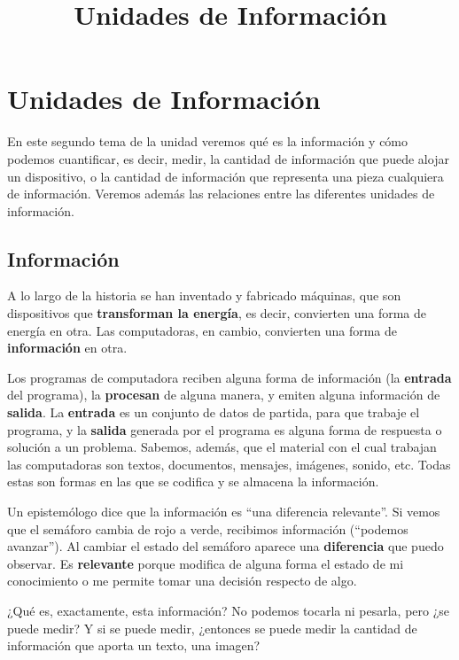 \documentclass[spanish,A4,]{article}
\title{Unidades de Información}
\begin{document}
\maketitle

\section{Unidades de Información}\label{unidades-de-informaciuxf3n}

En este segundo tema de la unidad veremos qué es la información y cómo
podemos cuantificar, es decir, medir, la cantidad de información que
puede alojar un dispositivo, o la cantidad de información que representa
una pieza cualquiera de información. Veremos además las relaciones entre
las diferentes unidades de información.

\subsection{Información}\label{informaciuxf3n}

A lo largo de la historia se han inventado y fabricado máquinas, que son
dispositivos que \textbf{transforman la energía}, es decir, convierten
una forma de energía en otra. Las computadoras, en cambio, convierten
una forma de \textbf{información} en otra.

Los programas de computadora reciben alguna forma de información (la
\textbf{entrada} del programa), la \textbf{procesan} de alguna manera, y
emiten alguna información de \textbf{salida}. La \textbf{entrada} es un
conjunto de datos de partida, para que trabaje el programa, y la
\textbf{salida} generada por el programa es alguna forma de respuesta o
solución a un problema. Sabemos, además, que el material con el cual
trabajan las computadoras son textos, documentos, mensajes, imágenes,
sonido, etc. Todas estas son formas en las que se codifica y se almacena
la información.

Un epistemólogo dice que la información es ``una diferencia relevante''.
Si vemos que el semáforo cambia de rojo a verde, recibimos información
(``podemos avanzar''). Al cambiar el estado del semáforo aparece una
\textbf{diferencia} que puedo observar. Es \textbf{relevante} porque
modifica de alguna forma el estado de mi conocimiento o me permite tomar
una decisión respecto de algo.

¿Qué es, exactamente, esta información? No podemos tocarla ni pesarla,
pero ¿se puede medir? Y si se puede medir, ¿entonces se puede medir la
cantidad de información que aporta un texto, una imagen?
\end{document}
